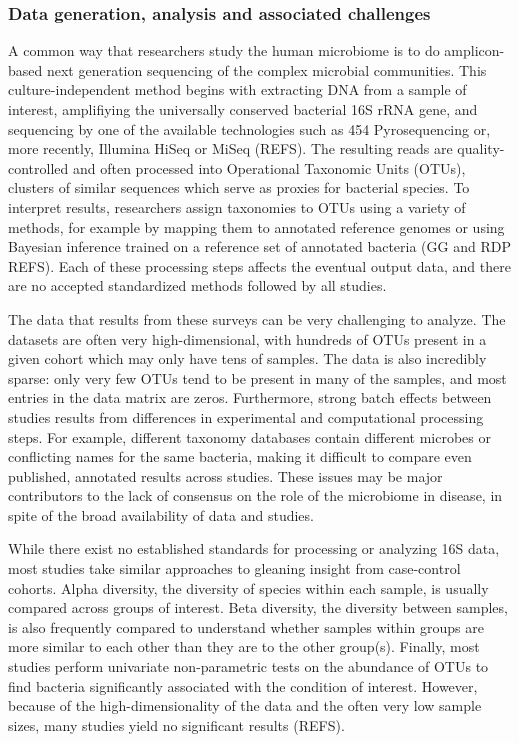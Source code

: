 \documentclass[12pt]{article}
\begin{document}
\subsubsection{Data generation, analysis and associated challenges} 
A common way that researchers study the human microbiome is to do 
amplicon-based next generation sequencing of the complex microbial 
communities. This culture-independent method begins with extracting
DNA from a sample of interest, amplifiying the universally conserved
bacterial 16S rRNA gene, and sequencing by one of the available technologies such as 454 
Pyrosequencing or, more recently, Illumina HiSeq or MiSeq (REFS). 
The resulting reads are quality-controlled and often processed into Operational Taxonomic Units (OTUs), 
clusters of similar sequences which serve as proxies for bacterial 
species. To interpret results, researchers assign taxonomies to 
OTUs using a variety of methods, for example by mapping them to 
annotated reference genomes or using Bayesian inference trained on 
a reference set of annotated bacteria (GG and RDP REFS). Each of 
these processing steps affects the eventual output data, and there
are no accepted standardized methods followed by all studies.

The data that results from these surveys can be very challenging to analyze.
The datasets are often very high-dimensional, with hundreds 
of OTUs present in a given cohort which may only have tens of samples. 
The data is also incredibly sparse: only very few OTUs tend to be 
present in many of the samples, and most entries in the data matrix 
are zeros. 
Furthermore, strong batch effects between studies results from 
differences in experimental and computational processing steps.
For example, different taxonomy databases contain different 
microbes or conflicting names for the same bacteria, making it 
difficult to compare even published, annotated results across studies.  
These issues may be major contributors to the lack of consensus on the 
role of the microbiome in disease, in spite of the broad availability of data and studies.

While there exist no established standards for processing or analyzing 
16S data, most studies take similar approaches to gleaning insight 
from case-control cohorts. 
 Alpha diversity, the diversity of species within each sample, is usually compared across groups of interest. 
Beta diversity, the diversity between samples, is also frequently compared to understand whether 
samples within groups are more similar to each 
other than they are to the other group(s). Finally, most studies perform 
univariate non-parametric tests on the abundance of OTUs to find 
bacteria significantly associated with the condition of interest. 
However, because of the high-dimensionality of the data and the 
often very low sample sizes, many studies yield no significant
results (REFS).
\end{document}
